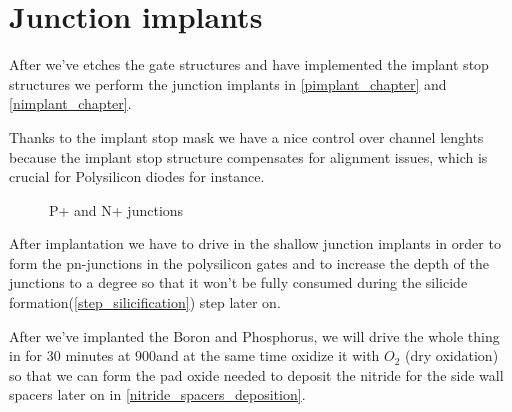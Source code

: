 \section{Junction implants}\label{junctions_chapter}

After we've etches the gate structures and have implemented the implant stop structures we perform the junction implants in \autoref{pimplant_chapter} and \autoref{nimplant_chapter}.

Thanks to the implant stop mask we have a nice control over channel lenghts because the implant stop structure compensates for alignment issues, which is crucial for Polysilicon diodes for instance.

\begin{figure}[H]
	\centering
	\begin{tikzpicture}[node distance = 3cm, auto, thick,scale=\CrossAndTopSectionBig, every node/.style={transform shape}]
		
	\end{tikzpicture}
	\caption{P+ and N+ junctions}
\end{figure}

After implantation we have to drive in the shallow junction implants in order to form the pn-junctions in the polysilicon gates and to increase the depth of the junctions
to a degree so that it won't be fully consumed during the silicide formation(\autoref{step_silicification}) step later on.

After we've implanted the Boron and Phosphorus, we will drive the whole thing in for 30 minutes at 900\degreesC and at the same time oxidize it with $O_2$ (dry oxidation) so that we can form the pad
oxide needed to deposit the nitride for the side wall spacers later on in \autoref{nitride_spacers_deposition}.

\newpage



